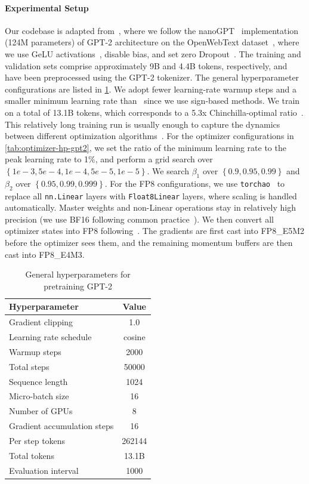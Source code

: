 \documentclass{article}
\newcommand{\cbrac}[1]{\left\{#1\right\}}
\begin{document}
\paragraph{Experimental Setup}
Our codebase is adapted from~\citet{qiu2026why}, where we follow the nanoGPT~\citep{nanogpt} implementation (124M parameters) of GPT-2 architecture on the OpenWebText dataset~\citep{Gokaslan2019OpenWeb}, where we use GeLU activations~\citep{hendrycks2016gelu}, disable bias, and set zero Dropout~\citep{JMLR:v15:srivastava14dropout}. The training and validation sets comprise approximately 9B and 4.4B tokens, respectively, and have been preprocessed using the GPT-2 tokenizer. The general hyperparameter configurations are listed in \cref{tab:general-hp-gpt2}. We adopt fewer learning-rate warmup steps and a smaller minimum learning rate than~\citet{hoffmann2022chinchilla} since we use sign-based methods. We train on a total of 13.1B tokens, which corresponds to a 5.3x Chinchilla-optimal ratio~\citep{hoffmann2022chinchilla}. This relatively long training run is usually enough to capture the dynamics between different optimization algorithms~\citep{an2025asgo}. For the optimizer configurations in \cref{tab:optimizer-hp-gpt2}, we set the ratio of the minimum learning rate to the peak learning rate to 1\%, and perform a grid search over $\cbrac{1e-3,5e-4,1e-4,5e-5,1e-5}$. We search $\beta_1$ over $\cbrac{0.9,0.95,0.99}$ and $\beta_2$ over $\cbrac{0.95,0.99,0.999}$. For the FP8 configurations, we use \texttt{torchao}~\citep{or2025torchao} to replace all \texttt{nn.Linear} layers with \texttt{Float8Linear} layers, where scaling is handled automatically. Master weights and non-Linear operations stay in relatively high precision (we use BF16 following common practice~\citep{an2025asgo,qiu2026why}). We then convert all optimizer states into FP8 following~\citet{NEURIPS2019hybrid_fp8,noune20228bit,micikevicius2022fp8}. The gradients are first cast into FP8\_E5M2 before the optimizer sees them, and the remaining momentum buffers are then cast into FP8\_E4M3.

\begin{table}[t]
\centering
\caption{General hyperparameters for pretraining GPT-2\label{tab:general-hp-gpt2}}
\centering
\begin{tabular}{lc}
\toprule
\textbf{Hyperparameter} & Value \\
\midrule
Gradient clipping & 1.0 \\
Learning rate schedule & cosine \\
Warmup steps & 2000 \\
Total steps   & 50000 \\
Sequence length & 1024 \\
Micro-batch size & 16 \\
Number of GPUs & 8 \\
Gradient accumulation steps & 16 \\
Per step tokens & 262144 \\
Total tokens & 13.1B \\
Evaluation interval & 1000 \\
\bottomrule
\end{tabular}
\end{table}
\end{document}
